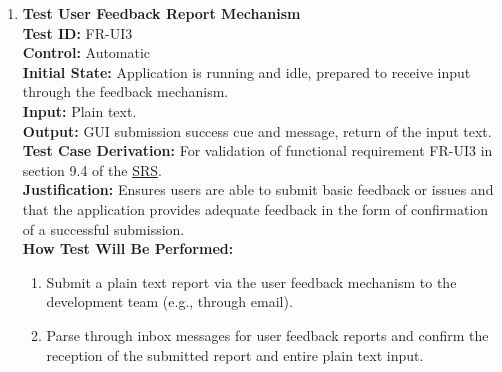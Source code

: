 \documentclass[12pt, titlepage]{article}
\begin{document}
\begin{enumerate}
    \item \textbf{Test User Feedback Report Mechanism} \\
      \newline
      \textbf{Test ID:} FR-UI3 \\
      \textbf{Control:} Automatic \\
      \textbf{Initial State:} Application is running and idle, prepared to receive input through the feedback mechanism. \\
      \textbf{Input:} Plain text. \\
      \textbf{Output:} GUI submission success cue and message, return of the input text. \\
      \textbf{Test Case Derivation:} For validation of functional requirement FR-UI3 in section 9.4 of the 
      \href{https://github.com/emilyperica/ScoreGen/blob/main/docs/SRS-Volere/SRS.pdf}{SRS}. \\
      \textbf{Justification:} Ensures users are able to submit basic feedback or issues and that the application provides adequate
      feedback in the form of confirmation of a successful submission.\\
      \textbf{How Test Will Be Performed:}
      \begin{enumerate}
          \item Submit a plain text report via the user feedback mechanism to the development team (e.g., through email).
          \item Parse through inbox messages for user feedback reports and confirm the reception of the submitted report and 
          entire plain text input.
      \end{enumerate}
  \end{enumerate}
\end{document}
